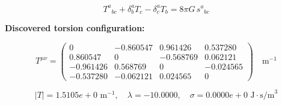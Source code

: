 
\begin{equation}
  T^a{}_{bc} + \delta^a_b T_c - \delta^a_c T_b = 8\pi G \, s^a{}_{bc}
\end{equation}

\textbf{Discovered torsion configuration:}

\begin{equation}
  T^{\mu\nu} = \begin{pmatrix}
    0 & -0.860547 & 0.961426 & 0.537280 \\
    0.860547 & 0 & -0.568769 & 0.062121 \\
    -0.961426 & 0.568769 & 0 & -0.024565 \\
    -0.537280 & -0.062121 & 0.024565 & 0
  \end{pmatrix} \quad \text{m}^{-1}
\end{equation}

\begin{equation}
  |T| = 1.5105e+0 \text{ m}^{-1}, \quad
  \lambda = -10.0000, \quad
  \sigma = 0.0000e+0 \text{ J}\cdot\text{s/m}^3
\end{equation}